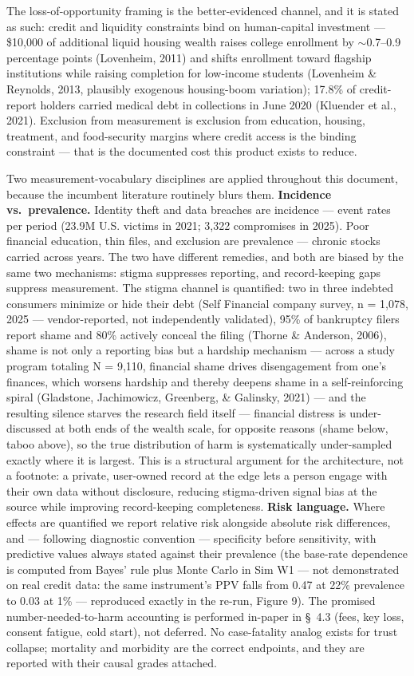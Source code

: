 \documentclass[
]{article}
\begin{document}
The loss-of-opportunity framing is the better-evidenced channel, and it
is stated as such: credit and liquidity constraints bind on
human-capital investment --- \$10,000 of additional liquid housing
wealth raises college enrollment by \(\sim\)0.7--0.9 percentage points
(Lovenheim, 2011) and shifts enrollment toward flagship institutions
while raising completion for low-income students (Lovenheim \& Reynolds,
2013, plausibly exogenous housing-boom variation); 17.8\% of
credit-report holders carried medical debt in collections in June 2020
(Kluender et al., 2021). Exclusion from measurement is exclusion from
education, housing, treatment, and food-security margins where credit
access is the binding constraint --- that is the documented cost this
product exists to reduce.

Two measurement-vocabulary disciplines are applied throughout this
document, because the incumbent literature routinely blurs them.
\textbf{Incidence vs.~prevalence.} Identity theft and data breaches are
incidence --- event rates per period (23.9M U.S. victims in 2021; 3,322
compromises in 2025). Poor financial education, thin files, and
exclusion are prevalence --- chronic stocks carried across years. The
two have different remedies, and both are biased by the same two
mechanisms: stigma suppresses reporting, and record-keeping gaps
suppress measurement. The stigma channel is quantified: two in three
indebted consumers minimize or hide their debt (Self Financial company
survey, n = 1,078, 2025 --- vendor-reported, not independently
validated), 95\% of bankruptcy filers report shame and 80\% actively
conceal the filing (Thorne \& Anderson, 2006), shame is not only a
reporting bias but a hardship mechanism --- across a study program
totaling N = 9,110, financial shame drives disengagement from one's
finances, which worsens hardship and thereby deepens shame in a
self-reinforcing spiral (Gladstone, Jachimowicz, Greenberg, \& Galinsky,
2021) --- and the resulting silence starves the research field itself
--- financial distress is under-discussed at both ends of the wealth
scale, for opposite reasons (shame below, taboo above), so the true
distribution of harm is systematically under-sampled exactly where it is
largest. This is a structural argument for the architecture, not a
footnote: a private, user-owned record at the edge lets a person engage
with their own data without disclosure, reducing stigma-driven signal
bias at the source while improving record-keeping completeness.
\textbf{Risk language.} Where effects are quantified we report relative
risk alongside absolute risk differences, and --- following diagnostic
convention --- specificity before sensitivity, with predictive values
always stated against their prevalence (the base-rate dependence is
computed from Bayes' rule plus Monte Carlo in Sim W1 --- not
demonstrated on real credit data: the same instrument's PPV falls from
0.47 at 22\% prevalence to 0.03 at 1\% --- reproduced exactly in the
re-run, Figure 9). The promised number-needed-to-harm accounting is
performed in-paper in §~4.3 (fees, key loss, consent fatigue, cold
start), not deferred. No case-fatality analog exists for trust collapse;
mortality and morbidity are the correct endpoints, and they are reported
with their causal grades attached.
\end{document}
